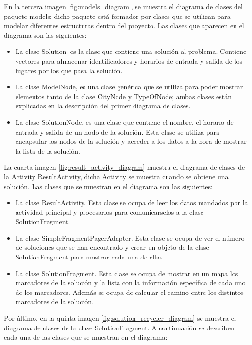 \vspace{0.06in}
En la tercera imagen \ref{fig:models_diagram}, se muestra el diagrama de clases del paquete models; dicho paquete está formador por clases que se utilizan para modelar diferentes estructuras dentro del proyecto. Las clases que aparecen en el diagrama son las siguientes:
\begin{itemize}
	\item La clase Solution, es la clase que contiene una solución al problema. Contiene vectores para almacenar identificadores y horarios de entrada y salida de los lugares por los que pasa la solución.
	\item La clase ModelNode, es una clase genérica que se utiliza para poder mostrar elementos tanto de la clase CityNode y TypeOfNode; ambas clases están explicadas en la descripción del primer diagrama de clases.
	\item La clase SolutionNode, es una clase que contiene el nombre, el horario de entrada y salida de un nodo de la solución. Esta clase se utiliza para encapsular los nodos de la solución y acceder a los datos a la hora de mostrar la lista de la solución.
\end{itemize}
\vspace{0.06in}
La cuarta imagen \ref{fig:result_activity_diagram} muestra el diagrama de clases de la Activity ResultActivity, dicha Activity se muestra cuando se obtiene una solución. Las clases que se muestran en el diagrama son las siguientes:
\begin{itemize}
	\item La clase ResultActivity. Esta clase se ocupa de leer los datos mandados por la actividad principal y procesarlos para comunicarselos a la clase SolutionFragment.
	\item La clase SimpleFragmentPagerAdapter. Esta clase se ocupa de ver el número de soluciones que se han encontrado y crear un objeto de la clase SolutionFragment para mostrar cada una de ellas.
	\item La clase SolutionFragment. Esta clase se ocupa de mostrar en un mapa los marcadores de la solución y la lista con la información específica de cada uno de los marcadores. Además se ocupa de calcular el camino entre los distintos marcadores de la solución.
\end{itemize}
\vspace{0.06in}
Por último, en la quinta imagen \ref{fig:solution_recycler_diagram} se muestra el diagrama de clases de la clase SolutionFragment. A continuación se describen cada una de las clases que se muestran en el diagrama:
